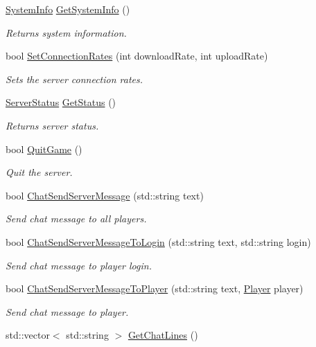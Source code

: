 \begin{DoxyCompactItemize}
\hyperlink{structSystemInfo}{System\-Info} \hyperlink{classMethods_a0030583fdad06ab0f2f589b79c904f09}{Get\-System\-Info} ()
\begin{DoxyCompactList}\small\item\em Returns system information. \end{DoxyCompactList}\item 
bool \hyperlink{classMethods_ae87b78f7ee53a98c8bf7494f662c2ad1}{Set\-Connection\-Rates} (int download\-Rate, int upload\-Rate)
\begin{DoxyCompactList}\small\item\em Sets the server connection rates. \end{DoxyCompactList}\item 
\hyperlink{structServerStatus}{Server\-Status} \hyperlink{classMethods_af39e05685756a82b5991a2fc25d5e941}{Get\-Status} ()
\begin{DoxyCompactList}\small\item\em Returns server status. \end{DoxyCompactList}\item 
\hypertarget{classMethods_aee11e205500b7ad449c025c8e3e4b11b}{bool \hyperlink{classMethods_aee11e205500b7ad449c025c8e3e4b11b}{Quit\-Game} ()}\label{classMethods_aee11e205500b7ad449c025c8e3e4b11b}

\begin{DoxyCompactList}\small\item\em Quit the server. \end{DoxyCompactList}\item 
bool \hyperlink{classMethods_a5e639d7a4fa2e2b403dfa5adfbc47ac3}{Chat\-Send\-Server\-Message} (std\-::string text)
\begin{DoxyCompactList}\small\item\em Send chat message to all players. \end{DoxyCompactList}\item 
bool \hyperlink{classMethods_a200065ea89c2694f9d2af3aae686c483}{Chat\-Send\-Server\-Message\-To\-Login} (std\-::string text, std\-::string login)
\begin{DoxyCompactList}\small\item\em Send chat message to player login. \end{DoxyCompactList}\item 
bool \hyperlink{classMethods_a616887260c024c6b7cabcdca9d43fdec}{Chat\-Send\-Server\-Message\-To\-Player} (std\-::string text, \hyperlink{structPlayer}{Player} player)
\begin{DoxyCompactList}\small\item\em Send chat message to player. \end{DoxyCompactList}\item 
\hypertarget{classMethods_a8a5de3ccd3e56cba116c5c1159c91c11}{std\-::vector$<$ std\-::string $>$ \hyperlink{classMethods_a8a5de3ccd3e56cba116c5c1159c91c11}{Get\-Chat\-Lines} ()}\label{classMethods_a8a5de3ccd3e56cba116c5c1159c91c11}


\end{DoxyCompactItemize}
